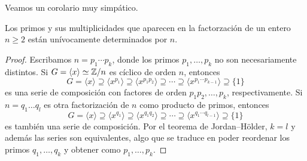 Veamos un corolario muy simpático.

\begin{corollary}
	Los primos y sus multiplicidades que aparecen en la factorzación de un entero $n\geq2$ están unívocamente determinados por $n$.
\end{corollary}

\begin{proof}
Escribamos $n=p_1\cdots p_k$, donde los primos $p_1,\dots,p_k$ no son necesariamente distintos. Si $G=\langle x\rangle\simeq\mathbb{Z}/n$ es cíclico de orden $n$, entonces
\[
G=\langle x\rangle\supseteq \langle x^{p_1}\rangle\supseteq \langle x^{p_1p_2}\rangle\supseteq\cdots\supseteq \langle x^{p_1\cdots p_{k-1}}\rangle\supseteq\{1\}
\]
es una serie de composición con factores de orden $p_1p_2,\dots,p_k$, respectivamente. Si $n=q_1\dots q_l$ es otra factorización de $n$ como producto de primos, entonces
\[
G=\langle x\rangle\supseteq \langle x^{q_1}\rangle\supseteq \langle x^{q_1q_2}\rangle\supseteq\cdots\supseteq \langle x^{q_1\cdots q_{l-1}}\rangle\supseteq\{1\}
\]
es también una serie de composición. Por el teorema de Jordan--Hölder, $k=l$ y además las series son equivalentes, algo que se traduce en poder reordenar los primos
$q_1,\dots,q_k$ y obtener como $p_1,\dots,p_k$. 
\end{proof}


 